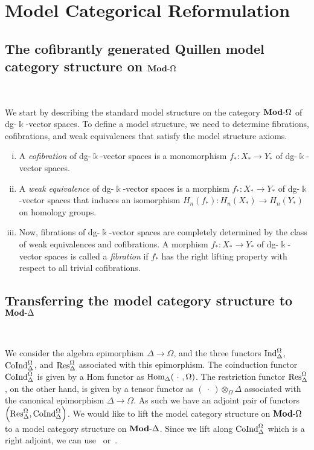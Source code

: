 \documentclass[a4paper,11pt]{amsart}
\theoremstyle{definition}
\newcommand{\rmod}[1]{\text{{\bf Mod}-}{#1}}
\newcommand{\Ind}{\text{\rm Ind}}
\newcommand{\Res}{\text{\rm Res}}
\newcommand{\Hom}{\text{\rm Hom}}
\newcommand{\CoInd}{\text{\rm CoInd}}
\newcommand{\Simp}{{\Delta}}
\newcommand{\Diff}{{\Omega}}
\begin{document}
\section{Model Categorical Reformulation}\label{sect:Quillen}

\subsection{The cofibrantly generated Quillen model category structure on $\rmod{\Diff}$}~

We start by describing the standard model structure on the category $\rmod{\Diff}$ of dg-$\Bbbk$-vector spaces. To define a model structure, we need to determine fibrations, cofibrations, and weak equivalences that satisfy the model structure axioms. 

\begin{enumerate}[(i)]

\item A \emph{cofibration} of dg-$\Bbbk$-vector spaces is a monomorphism $f_*\colon X_*\to Y_*$ of dg-$\Bbbk$-vector spaces.

\item A \emph{weak equivalence} of dg-$\Bbbk$-vector spaces is a morphism $f_* \colon X_* \to Y_*$ of dg-$\Bbbk$-vector spaces that induces an isomorphism $H_n(f_*)\colon H_n(X_*)\to H_n(Y_*)$ on homology groups.

\item Now, fibrations of dg-$\Bbbk$-vector spaces are completely determined by the class of weak equivalences and cofibrations. A morphism $f_*\colon X_*\to Y_*$ of dg-$\Bbbk$-vector spaces is called a \emph{fibration} if $f_*$ has the right lifting property with respect to all trivial cofibrations.

\end{enumerate}


\subsection{Transferring the model category structure to $\rmod{\Simp}$}~

We consider the algebra epimorphism $\Simp \to \Diff$, and the three functors $\Ind_{\Simp}^\Diff$, $\CoInd_{\Simp}^\Diff$, and $\Res_{\Simp}^\Diff$ associated with this epimorphism. The coinduction functor $\CoInd_{\Simp}^\Diff$ is given by a Hom functor as $\Hom_{\Simp}(\ \cdot\ ,\Diff)$.  The restriction functor $\Res_{\Simp}^\Diff$, on the other hand, is given by a tensor functor as $(\ \cdot\ )\otimes_{\Diff}\Simp$ associated with the canonical epimorphism $\Simp\to \Diff$. As such we have an adjoint pair of functors $\left(\Res_{\Simp}^\Diff,\CoInd_{\Simp}^\Diff\right)$. We would like to lift the model category structure on $\rmod{\Diff}$ to a model category structure on $\rmod{\Simp}$.  Since we lift along $\CoInd_{\Simp}^\Diff$ which is a right adjoint, we can use~\cite[Theorems 11.3.1 and 11.3.2]{hirschhorn2009model} or~\cite[Thm.7.44]{heuts_simplicial_2022}.
\end{document}
